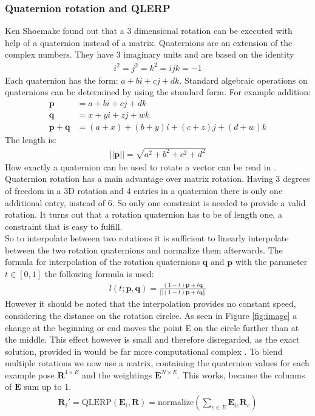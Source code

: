 \subsubsection{Quaternion rotation and QLERP}
Ken Shoemake found out that a 3 dimensional rotation can be executed with help of a quaternion instead of a matrix. Quaternions are an extension of the complex numbers. They have 3 imaginary units and are based on the identity
\begin{align}
i^2=j^2=k^2=ijk=-1
\end{align}
Each quaternion has the form: $a+ bi+cj+dk$.
Standard algebraic operations on quaternions can be determined by using the standard form. For example addition:
\begin{align}
\bm p &= a+ bi+cj+dk\\
\bm q &= x+ yi + zj+wk\\
\bm p+ \bm q &= (a+ x) + (b+y)i + (c+z)j + (d+w)k
\end{align}
The length is:
\begin{align}
||\bm p|| = \sqrt{a^2+b^2+c^2+d^2}
\end{align}
How exactly a quaternion can be used to rotate a vector can be read in \cite{Quat}.\\
Quaternion rotation has a main advantage over matrix rotation. Having 3 degrees of freedom in a 3D rotation and 4 entries in a quaternion there is only one additional entry, instead of 6. So only one constraint is needed to provide a valid rotation. It turns out that a rotation quaternion has to be of length one, a constraint that is easy to fulfill.\\
So to interpolate between two rotations it is sufficient to linearly interpolate between the two rotation quaternions and normalize them afterwards. \cite{QLERP}
The formula for interpolation of the rotation quaternions $\bm q$ and $\bm p$ with the parameter $t \in[0,1]$ the following formula is used:
\begin{align}
l(t;\bm{p},\bm{q}) = \frac{(1-t)\bm{p} + t\bm{q}}{||(1-t)\bm{p} + t\bm{q}||}
\end{align}
However it should be noted that the interpolation provides no constant speed, considering the distance on the rotation circlee. As seen in Figure \ref{fig:image} a change at the beginning or end moves the point E on the circle further than at the middle. This effect however is small and therefore disregarded, as the exact solution, provided in \cite{Quat} would be far more computational complex \cite{QLERP}.
To blend multiple rotations we now use a matrix, containing the quaternion values for each example pose $\bm{R}^{4\times E}$ and the weightings $\bm{E}^{N\times E}$. This works, because the columns of $\bm{E}$ sum up to 1.
\begin{align}
\bm{R}_i' =\text{QLERP} (\bm{E}_i,\bm{R}) = \text{normalize} \left( \sum_{e\in E} \bm{E}_{ie} \bm{R}_{e}\right)
\end{align}


